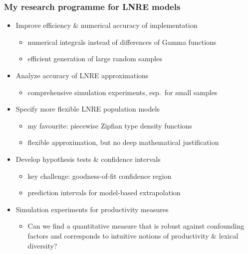 \documentclass[t]{beamer} %
\begin{document}
\begin{frame}[c]
  \frametitle{My research programme for LNRE models}

  \begin{itemize}
  \item Improve efficiency \& numerical accuracy of implementation
    \begin{itemize}
    \item numerical integrals instead of differences of Gamma functions
    \item efficient generation of large random samples
    \end{itemize}
  \item Analyze accuracy of LNRE approximations
    \begin{itemize}
    \item comprehensive simulation experiments, esp.\ for small samples
    \end{itemize}
  \item Specify more flexible LNRE population models
    \begin{itemize}
    \item my favourite: piecewise Zipfian type density functions
    \item flexible approximation, but no deep mathematical justification
    \end{itemize}
  \item Develop hypothesis tests \& confidence intervals
    \begin{itemize}
    \item key challenge: goodness-of-fit \vs confidence region
    \item prediction intervals for model-based extrapolation
    \end{itemize}
  \item Simulation experiments for productivity measures
    \begin{itemize}
    \item Can we find a quantitative measure that is robust against confounding factors and corresponds to intuitive notions of productivity \& lexical diversity?
    \end{itemize}
  \end{itemize}
\end{frame}
\end{document}
